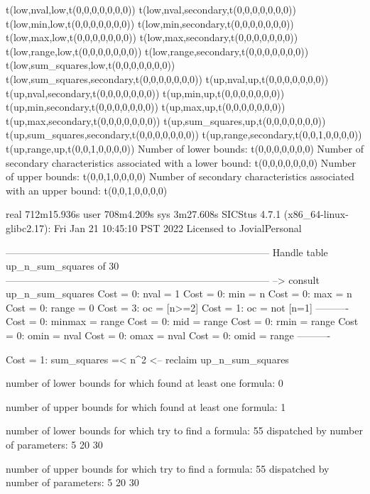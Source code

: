 t(low,nval,low,t(0,0,0,0,0,0,0))
t(low,nval,secondary,t(0,0,0,0,0,0,0))
t(low,min,low,t(0,0,0,0,0,0,0))
t(low,min,secondary,t(0,0,0,0,0,0,0))
t(low,max,low,t(0,0,0,0,0,0,0))
t(low,max,secondary,t(0,0,0,0,0,0,0))
t(low,range,low,t(0,0,0,0,0,0,0))
t(low,range,secondary,t(0,0,0,0,0,0,0))
t(low,sum_squares,low,t(0,0,0,0,0,0,0))
t(low,sum_squares,secondary,t(0,0,0,0,0,0,0))
t(up,nval,up,t(0,0,0,0,0,0,0))
t(up,nval,secondary,t(0,0,0,0,0,0,0))
t(up,min,up,t(0,0,0,0,0,0,0))
t(up,min,secondary,t(0,0,0,0,0,0,0))
t(up,max,up,t(0,0,0,0,0,0,0))
t(up,max,secondary,t(0,0,0,0,0,0,0))
t(up,sum_squares,up,t(0,0,0,0,0,0,0))
t(up,sum_squares,secondary,t(0,0,0,0,0,0,0))
t(up,range,secondary,t(0,0,1,0,0,0,0))
t(up,range,up,t(0,0,1,0,0,0,0))
Number of lower bounds:                                             t(0,0,0,0,0,0,0)
Number of secondary characteristics associated with a lower bound:  t(0,0,0,0,0,0,0)
Number of upper bounds:                                             t(0,0,1,0,0,0,0)
Number of secondary characteristics associated with an upper bound: t(0,0,1,0,0,0,0)

real	712m15.936s
user	708m4.209s
sys	3m27.608s
SICStus 4.7.1 (x86_64-linux-glibc2.17): Fri Jan 21 10:45:10 PST 2022
Licensed to JovialPersonal


--------------------------------------------------------------------------------
Handle table up_n_sum_squares of 30
--------------------------------------------------------------------------------
--> consult up_n_sum_squares
Cost =  0:  nval   = 1
Cost =  0:  min    = n
Cost =  0:  max    = n
Cost =  0:  range  = 0
Cost =  3:  oc     = [n>=2]
Cost =  1:  oc     = not [n=1]
----------
Cost =  0:  minmax = range
Cost =  0:  mid    = range
Cost =  0:  rmin   = range
Cost =  0:  omin   = nval
Cost =  0:  omax   = nval
Cost =  0:  omid   = range
----------

Cost =  1:  sum_squares =< n^2
<-- reclaim up_n_sum_squares

number of lower bounds for which found at least one formula: 0

number of upper bounds for which found at least one formula: 1

number of lower bounds for which try to find a formula: 55
dispatched by number of parameters: 5  20  30

number of upper bounds for which try to find a formula: 55
dispatched by number of parameters: 5  20  30

